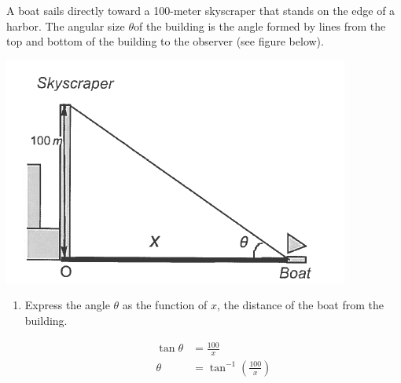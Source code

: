 \documentclass[nooutcomes]{ximera}
\begin{document}
\begin{problem}
A boat sails directly toward a 100-meter skyscraper that stands on the edge of a harbor.  The angular size $\theta$of the building is the angle formed by lines from the top and bottom of the building to the observer (see figure below).
    \begin{image}
      \includegraphics[scale = 0.7]{figure6.png}
    \end{image}

\begin{enumerate}
	\item Express the angle $\theta$ as the function of $x$, the distance of the boat from the building.
	\begin{freeResponse}
	\begin{align*}
	\tan\theta&=\frac{100}{x}\\
	\theta&=\tan^{-1}\left( \frac{100}{x} \right)
	\end{align*}
	\end{freeResponse}
	

\end{enumerate}
\end{problem}
\end{document}
